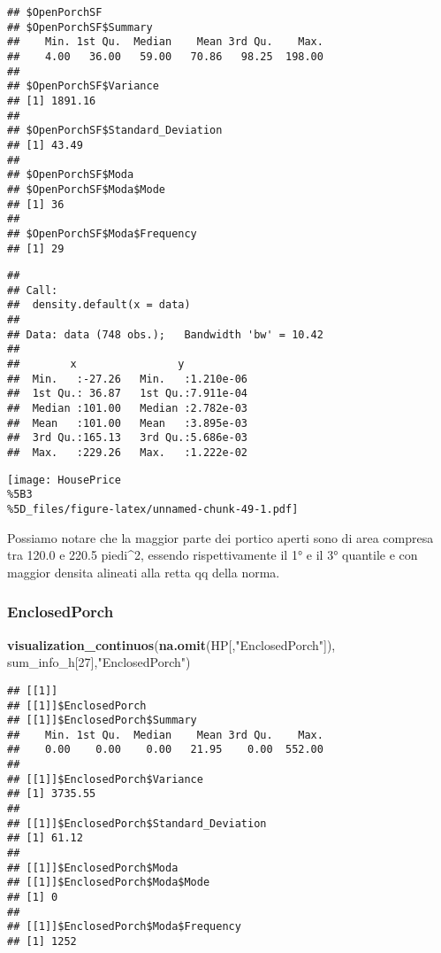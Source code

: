 \documentclass[
]{article}
\newenvironment{Shaded}{\begin{snugshade}}{\end{snugshade}}
\newcommand{\DecValTok}[1]{\textcolor[rgb]{0.00,0.00,0.81}{#1}}
\newcommand{\FunctionTok}[1]{\textcolor[rgb]{0.13,0.29,0.53}{\textbf{#1}}}
\newcommand{\NormalTok}[1]{#1}
\newcommand{\StringTok}[1]{\textcolor[rgb]{0.31,0.60,0.02}{#1}}
\begin{document}
\begin{verbatim}
## $OpenPorchSF
## $OpenPorchSF$Summary
##    Min. 1st Qu.  Median    Mean 3rd Qu.    Max. 
##    4.00   36.00   59.00   70.86   98.25  198.00 
## 
## $OpenPorchSF$Variance
## [1] 1891.16
## 
## $OpenPorchSF$Standard_Deviation
## [1] 43.49
## 
## $OpenPorchSF$Moda
## $OpenPorchSF$Moda$Mode
## [1] 36
## 
## $OpenPorchSF$Moda$Frequency
## [1] 29
\end{verbatim}

\begin{verbatim}
## 
## Call:
##  density.default(x = data)
## 
## Data: data (748 obs.);   Bandwidth 'bw' = 10.42
## 
##        x                y            
##  Min.   :-27.26   Min.   :1.210e-06  
##  1st Qu.: 36.87   1st Qu.:7.911e-04  
##  Median :101.00   Median :2.782e-03  
##  Mean   :101.00   Mean   :3.895e-03  
##  3rd Qu.:165.13   3rd Qu.:5.686e-03  
##  Max.   :229.26   Max.   :1.222e-02
\end{verbatim}

\texttt{[image: HousePrice\\\%5B3\\\%5D\_files/figure-latex/unnamed-chunk-49-1.pdf]}

Possiamo notare che la maggior parte dei portico aperti sono di area
compresa tra 120.0 e 220.5 piedi\^{}2, essendo rispettivamente il 1° e
il 3° quantile e con maggior densita alineati alla retta qq della norma.

\subsubsection{EnclosedPorch}\label{enclosedporch}

\begin{Shaded}
\begin{Highlighting}[]
\FunctionTok{visualization\_continuos}\NormalTok{(}\FunctionTok{na.omit}\NormalTok{(HP[,}\StringTok{"EnclosedPorch"}\NormalTok{]), sum\_info\_h[}\DecValTok{27}\NormalTok{],}\StringTok{"EnclosedPorch"}\NormalTok{)}
\end{Highlighting}
\end{Shaded}

\begin{verbatim}
## [[1]]
## [[1]]$EnclosedPorch
## [[1]]$EnclosedPorch$Summary
##    Min. 1st Qu.  Median    Mean 3rd Qu.    Max. 
##    0.00    0.00    0.00   21.95    0.00  552.00 
## 
## [[1]]$EnclosedPorch$Variance
## [1] 3735.55
## 
## [[1]]$EnclosedPorch$Standard_Deviation
## [1] 61.12
## 
## [[1]]$EnclosedPorch$Moda
## [[1]]$EnclosedPorch$Moda$Mode
## [1] 0
## 
## [[1]]$EnclosedPorch$Moda$Frequency
## [1] 1252
\end{verbatim}
\end{document}
